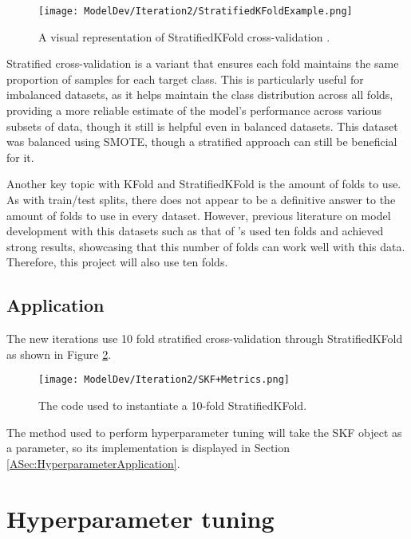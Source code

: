 \begin{figure}[H]
    \centering 
    \texttt{[image: ModelDev/Iteration2/StratifiedKFoldExample.png]}
    \caption{A visual representation of StratifiedKFold cross-validation \autocite{muller_data_nodate}.}
    \label{fig:SKFExample}
\end{figure}

\para Stratified cross-validation is a variant that ensures each fold maintains the same proportion of samples for each 
target class. This is particularly useful for imbalanced datasets, as it helps maintain the class
distribution across all folds, providing a more reliable estimate of the model's performance across various subsets of data, 
though it still is helpful even in balanced datasets. This dataset was balanced using SMOTE, though a stratified approach 
can still be beneficial for it.

\para Another key topic with KFold and StratifiedKFold is the amount of folds to use. As with train/test splits, there 
does not appear to be a definitive answer to the amount of folds to use in every dataset. However, previous literature 
on model development with this datasets such as that of \textcite{zou_construction_2024}'s used ten folds and achieved 
strong results, showcasing that this number of folds can work well with this data. Therefore, this project will also use ten folds.

\pagebreak 

\subsection{Application}
The new iterations use 10 fold stratified cross-validation through StratifiedKFold as shown in Figure \ref{fig:SKFCode}. 

\begin{figure}[H]
    \centering 
    \texttt{[image: ModelDev/Iteration2/SKF+Metrics.png]}
    \caption{The code used to instantiate a 10-fold StratifiedKFold.}
    \label{fig:SKFCode}
\end{figure}

\para The method used to perform hyperparameter tuning will take the SKF object as a parameter, so its implementation 
is displayed in Section \ref{ASec:HyperparameterApplication}.


\section{Hyperparameter tuning}

